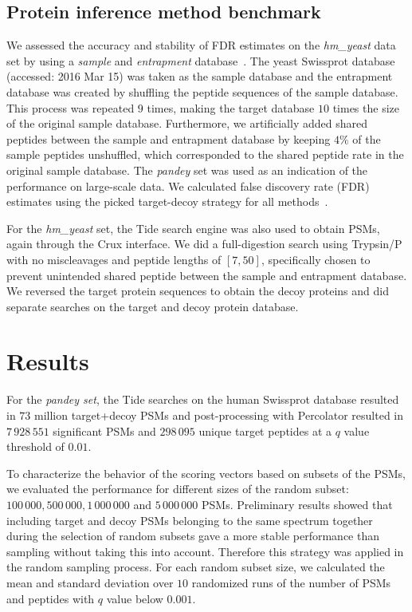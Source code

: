 \documentclass{article}
\begin{document}
\subsection*{Protein inference method benchmark}

We assessed the accuracy and stability of FDR estimates on the {\em
hm\_yeast} data set by using a {\em sample} and {\em entrapment}
database~\cite{granholm2013determining}. The yeast Swissprot database
(accessed: 2016 Mar 15) was taken as the sample database and the
entrapment database was created by shuffling the peptide sequences of
the sample database. This process was repeated $9$ times, making the
target database $10$ times the size of the original sample database.
Furthermore, we artificially added shared peptides between the sample
and entrapment database by keeping $4\%$ of the sample peptides
unshuffled, which corresponded to the shared peptide rate in the
original sample database. The {\em pandey} set was used as an
indication of the performance on large-scale data. We calculated false
discovery rate (FDR) estimates using the picked target-decoy strategy
for all methods~\cite{savitski2015scalable}.

For the {\em hm\_yeast} set, the Tide search engine was also used to
obtain PSMs, again through the Crux interface. We did a full-digestion
search using Trypsin/P with no miscleavages and peptide lengths of
$[7,50]$, specifically chosen to prevent unintended shared peptide
between the sample and entrapment database. We reversed the target
protein sequences to obtain the decoy proteins and did separate
searches on the target and decoy protein database.

\section*{Results}

For the {\em pandey set}, the Tide searches on the human Swissprot
database resulted in $73$ million target+decoy PSMs and
post-processing with Percolator resulted in $7\,928\,551$ significant
PSMs and $298\,095$ unique target peptides at a $q$ value threshold of
$0.01$.

To characterize the behavior of the scoring vectors based on subsets
of the PSMs, we evaluated the performance for different sizes of the
random subset: $100\,000, 500\,000, 1\,000\,000$ and $5\,000\,000$
PSMs. Preliminary results showed that including target and
decoy PSMs belonging to the same spectrum together during the
selection of random subsets gave a more stable performance than
sampling without taking this into account. Therefore this strategy was
applied in the random sampling process. For each random subset
size, we calculated the mean and standard deviation over $10$
randomized runs of the number of PSMs and peptides with $q$ value
below $0.001$.
\end{document}
